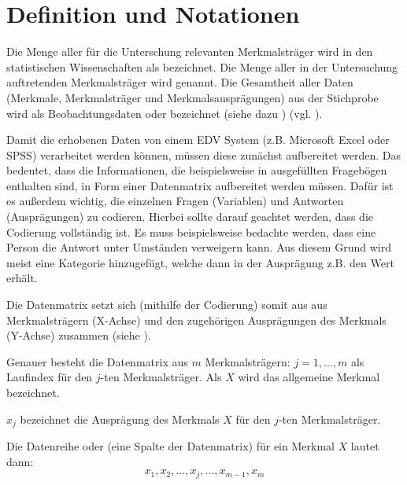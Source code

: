 \section{Definition und Notationen}\label{sec:defNot}
Die Menge aller für die Unterschung relevanten Merkmalsträger wird in den statistischen
Wissenschaften als  bezeichnet. Die Menge aller in der Untersuchung auftretenden
Merkmalsträger wird  genannt. Die Gesamtheit aller Daten (Merkmale, Merkmalsträger
und Merkmalsausprägungen) aus der Stichprobe wird als Beobachtungsdaten oder  bezeichnet
(siehe dazu ) (vgl. ).

 
Damit die erhobenen Daten von einem EDV System (z.B. Microsoft Excel oder SPSS) verarbeitet werden
können, müssen diese zunächst aufbereitet werden. Das bedeutet, dass die Informationen, die
beispielsweise in ausgefüllten Fragebögen enthalten sind, in Form einer Datenmatrix aufbereitet
werden müssen. Dafür ist es außerdem wichtig, die einzelnen Fragen (Variablen) und Antworten
(Ausprägungen) zu codieren. Hierbei sollte darauf geachtet werden, dass die Codierung vollständig
ist. Es muss beispielsweise bedachte werden, dass eine Person die Antwort unter Umständen
verweigern kann. Aus diesem Grund wird meist eine Kategorie  hinzugefügt, welche
dann in der Ausprägung z.B. den Wert  erhält. 

Die Datenmatrix setzt sich (mithilfe der Codierung) somit aus aus Merkmalsträgern (X-Achse) und den 
zugehörigen Ausprägungen des Merkmals (Y-Achse) zusammen (siehe ).


Genauer besteht die Datenmatrix aus $m$ Merkmalsträgern: $j=1,...,m$ als Laufindex für den
$j$-ten Merkmalsträger. Als $X$ wird das allgemeine Merkmal bezeichnet.

$x_j$ bezeichnet die Ausprägung des Merkmals $X$ für den $j$-ten Merkmalsträger. 

Die Datenreihe oder  (eine Spalte der Datenmatrix) für ein Merkmal $X$
lautet dann: \[x_1, x_2 ,..., x_j ,..., x_{m-1},x_m\]

